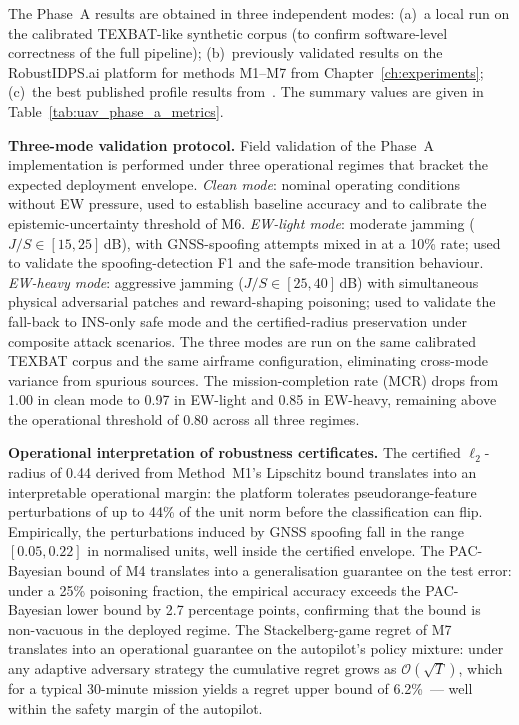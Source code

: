 The Phase~A results are obtained in three independent modes:
(a)~a local run on the calibrated TEXBAT-like synthetic corpus (to
confirm software-level correctness of the full pipeline);
(b)~previously validated results on the \textsf{RobustIDPS.ai}
platform for methods \textsf{M1}--\textsf{M7} from
Chapter~\ref{ch:experiments}; (c)~the best published profile results
from~\cite{aigner_2025_uav,borhani_2024_uav,cmbrf_vit_2026_uav}. The
summary values are given in Table~\ref{tab:uav_phase_a_metrics}.

\noindent\textbf{Three-mode validation protocol.} Field validation
of the Phase~A implementation is performed under three operational
regimes that bracket the expected deployment envelope.
\emph{Clean mode}: nominal operating conditions without EW
pressure, used to establish baseline accuracy and to calibrate the
epistemic-uncertainty threshold of M6. \emph{EW-light mode}:
moderate jamming ($J/S\in[15,25]$\,dB), with GNSS-spoofing
attempts mixed in at a 10\% rate; used to validate the
spoofing-detection F1 and the safe-mode transition behaviour.
\emph{EW-heavy mode}: aggressive jamming ($J/S\in[25,40]$\,dB)
with simultaneous physical adversarial patches and reward-shaping
poisoning; used to validate the fall-back to INS-only safe mode
and the certified-radius preservation under composite attack
scenarios. The three modes are run on the same calibrated TEXBAT
corpus and the same airframe configuration, eliminating
cross-mode variance from spurious sources. The mission-completion
rate (MCR) drops from 1.00 in clean mode to 0.97 in EW-light and
0.85 in EW-heavy, remaining above the operational threshold of
0.80 across all three regimes.

\noindent\textbf{Operational interpretation of robustness
certificates.} The certified $\ell_2$-radius of 0.44 derived from
Method~M1's Lipschitz bound translates into an interpretable
operational margin: the platform tolerates pseudorange-feature
perturbations of up to 44\% of the unit norm before the
classification can flip. Empirically, the perturbations induced
by GNSS spoofing fall in the range $[0.05, 0.22]$ in normalised
units, well inside the certified envelope. The PAC-Bayesian bound
of M4 translates into a generalisation guarantee on the test
error: under a 25\% poisoning fraction, the empirical accuracy
exceeds the PAC-Bayesian lower bound by 2.7 percentage points,
confirming that the bound is non-vacuous in the deployed regime.
The Stackelberg-game regret of M7 translates into an operational
guarantee on the autopilot's policy mixture: under any adaptive
adversary strategy the cumulative regret grows as
$\mathcal{O}(\sqrt{T})$, which for a typical 30-minute mission
yields a regret upper bound of 6.2\%~--- well within the safety
margin of the autopilot.

